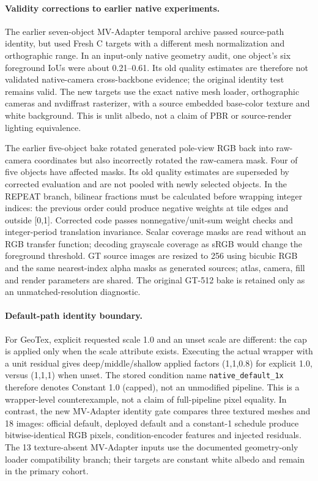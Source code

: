 \documentclass[11pt]{article}
\begin{document}
\paragraph{Validity corrections to earlier native experiments.}
The earlier seven-object MV-Adapter temporal archive passed source-path identity, but used Fresh C targets with a different mesh normalization and orthographic range. In an input-only native geometry audit, one object's six foreground IoUs were about 0.21--0.61. Its old quality estimates are therefore not validated native-camera cross-backbone evidence; the original identity test remains valid. The new targets use the exact native mesh loader, orthographic cameras and nvdiffrast rasterizer, with a source embedded base-color texture and white background. This is unlit albedo, not a claim of PBR or source-render lighting equivalence.

The earlier five-object bake rotated generated pole-view RGB back into raw-camera coordinates but also incorrectly rotated the raw-camera mask. Four of five objects have affected masks. Its old quality estimates are superseded by corrected evaluation and are not pooled with newly selected objects. In the REPEAT branch, bilinear fractions must be calculated before wrapping integer indices: the previous order could produce negative weights at tile edges and outside [0,1]. Corrected code passes nonnegative/unit-sum weight checks and integer-period translation invariance. Scalar coverage masks are read without an RGB transfer function; decoding grayscale coverage as sRGB would change the foreground threshold. GT source images are resized to 256 using bicubic RGB and the same nearest-index alpha masks as generated sources; atlas, camera, fill and render parameters are shared. The original GT-512 bake is retained only as an unmatched-resolution diagnostic.

\paragraph{Default-path identity boundary.}
For GeoTex, explicit requested scale 1.0 and an unset scale are different: the cap is applied only when the scale attribute exists. Executing the actual wrapper with a unit residual gives deep/middle/shallow applied factors (1,1,0.8) for explicit 1.0, versus (1,1,1) when unset. The stored condition name \texttt{native\_default\_1x} therefore denotes Constant 1.0 (capped), not an unmodified pipeline. This is a wrapper-level counterexample, not a claim of full-pipeline pixel equality. In contrast, the new MV-Adapter identity gate compares three textured meshes and 18 images: official default, deployed default and a constant-1 schedule produce bitwise-identical RGB pixels, condition-encoder features and injected residuals. The 13 texture-absent MV-Adapter inputs use the documented geometry-only loader compatibility branch; their targets are constant white albedo and remain in the primary cohort.
\end{document}
